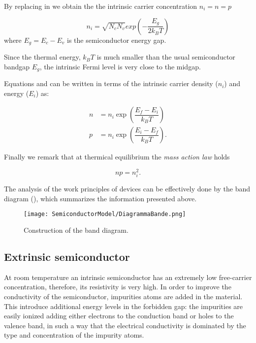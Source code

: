 By replacing  in  we obtain the the intrinsic carrier concentration $n_i=n=p$

\begin{equation}
\label{eq: ni equilibrium NcNv}
n_i = \sqrt{N_cN_v}exp\left(-\dfrac{E_g}{2k_B T}\right)
\end{equation}
where $E_g=E_c-E_v$ is the semiconductor energy gap.

\begin{Osservazione}
Since the thermal energy, $k_BT$ is much smaller than the usual semiconductor bandgap $E_g$, the intrinsic Fermi level is very close to the midgap.
\end{Osservazione}

Equations  and  can be written in terms of the intrinsic carrier density ($n_i$) and energy ($E_i$) as:

\begin{align}
n & = n_i \exp\left(\dfrac{E_f-E_i}{k_B T}\right) \label{eq: n density mb}\\
p & = n_i \exp\left(\dfrac{E_i-E_f}{k_B T}\right)  \label{eq: p density mb}.
\end{align}

Finally we remark that at thermical equilibrium the \textit{mass action law} holds

\begin{equation}
\label{eq: legge di azione di massa}
np=n_i^2.
\end{equation}


The analysis of the work principles of devices can be effectively done by the band diagram (), which summarizes the information presented above.
\begin{figure}[!h]
\centering
\texttt{[image: SemiconductorModel/DiagrammaBande.png]}
\caption{Construction of the band diagram.}
\label{fig: band diagram}
\end{figure}

\subsection{Extrinsic semiconductor}
At room temperature an intrinsic semiconductor has an extremely low free-carrier concentration, therefore, its resistivity is very high. In order to improve the conductivity of the semiconductor, impurities atoms are added in the material. This introduce additional energy levels in the forbidden gap: the impurities are easily ionized adding either electrons to the conduction band or holes to the valence band, in such a way that the electrical conductivity is dominated by the type and concentration of the impurity atoms.

